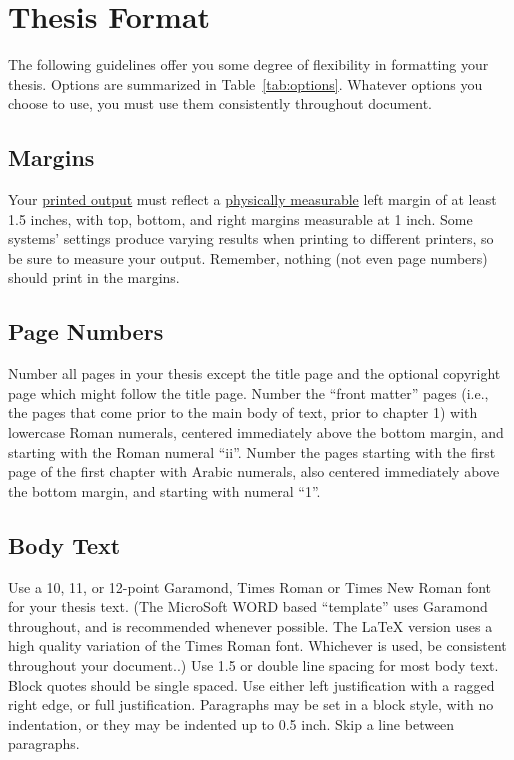\chapter{Thesis Format}
\label{cpt:format}

The following guidelines offer you some degree of flexibility in formatting
your thesis. Options are summarized in Table~\ref{tab:options}.  Whatever
options you choose to use, you must use them consistently throughout document.

\section{Margins}

Your \underline{printed output} must reflect a \underline{physically
measurable} left margin of at least 1.5 inches, with top, bottom, and right
margins measurable at 1 inch.  Some systems' settings produce varying results
when printing to different printers, so be sure to measure your output.
Remember, nothing (not even page numbers) should print in the margins.

\section{Page Numbers}

Number all pages in your thesis except the title page and the optional
copyright page which might follow the title page.  Number the ``front matter''
pages (i.e., the pages that come prior to the main body of text, prior to
chapter 1) with lowercase Roman numerals, centered immediately above the bottom
margin, and starting with the Roman numeral ``ii''.  Number the pages starting
with the first page of the first chapter with Arabic numerals, also centered
immediately above the bottom margin, and starting with numeral ``1''.

\section{Body Text}

Use a 10, 11, or 12-point Garamond, Times Roman or Times New Roman font for
your thesis text.  {\scriptsize (The MicroSoft WORD based ``template'' uses
Garamond throughout, and is recommended whenever possible.  The \LaTeX{}
version uses a high quality variation of the Times Roman font.  Whichever is
used, be consistent throughout your document..)}  Use 1.5 or double line
spacing for most body text.  Block quotes should be single spaced.  Use either
left justification with a ragged right edge, or full justification.  Paragraphs
may be set in a block style, with no indentation, or they may be indented up to
0.5 inch.  Skip a line between paragraphs.

